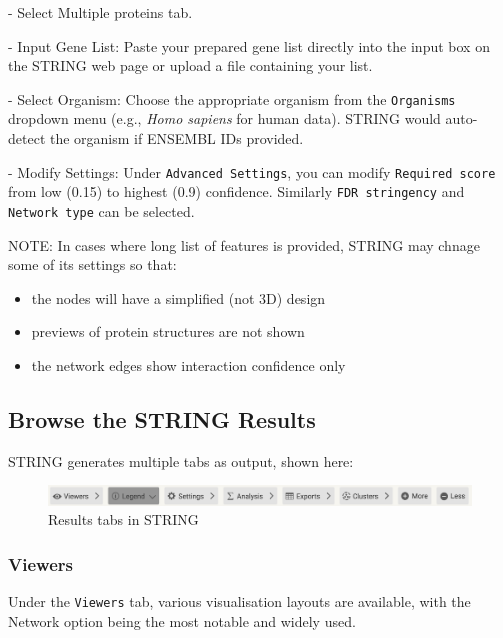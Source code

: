 \documentclass[
]{book}
\providecommand{\tightlist}{%
  \setlength{\itemsep}{0pt}\setlength{\parskip}{0pt}}
\begin{document}
{- Select Multiple proteins tab.}

{- Input Gene List:} Paste your prepared gene list directly into the input box on the STRING web page or upload a file containing your list.

{- Select Organism:} Choose the appropriate organism from the \texttt{Organisms} dropdown menu (e.g., \emph{Homo sapiens} for human data). STRING would auto-detect the organism if ENSEMBL IDs provided.

{- Modify Settings:} Under \texttt{Advanced\ Settings}, you can modify \texttt{Required\ score} from low (0.15) to highest (0.9) confidence. Similarly \texttt{FDR\ stringency} and \texttt{Network\ type} can be selected.

NOTE: In cases where long list of features is provided, STRING may chnage some of its settings so that:

\begin{itemize}
\tightlist
\item
  the nodes will have a simplified (not 3D) design
\item
  previews of protein structures are not shown
\item
  the network edges show interaction confidence only
\end{itemize}

\hypertarget{browse-the-string-results}{%
\subsection{Browse the STRING Results}\label{browse-the-string-results}}

STRING generates multiple tabs as output, shown here:

\begin{figure}

{\centering \includegraphics[width=1\linewidth]{images/string-results-tabs} 

}

\caption{Results tabs in STRING}\label{fig:unnamed-chunk-18}
\end{figure}

\hypertarget{viewers}{%
\subsubsection{Viewers}\label{viewers}}

Under the \texttt{Viewers} tab, various visualisation layouts are available, with the Network option being the most notable and widely used.
\end{document}
